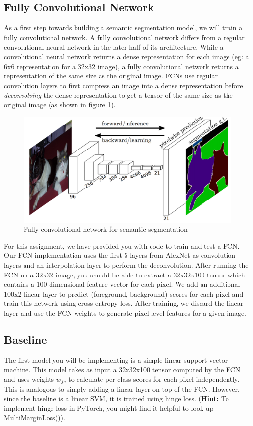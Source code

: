 \documentclass[11pt,addpoints,answers]{exam}
\numberwithin{equation}{section} %
\numberwithin{figure}{section} %
\numberwithin{table}{section} %
\begin{document}
\subsection{Fully Convolutional Network}
As a first step towards building a semantic segmentation model, we will train a fully convolutional network. A fully convolutional network differs from a regular convolutional neural network in the later half of its architecture. While a convolutional neural network returns a dense representation for each image (eg: a 6x6 representation for a 32x32 image), a fully convolutional network returns a representation of the same size as the original image. FCNs use regular convolution layers to first compress an image into a dense representation before \emph{deconvolving} the dense representation to get a tensor of the same size as the original image (as shown in figure \ref{fig:fcn}). 

\begin{figure}[h]
    \centering
    \includegraphics[scale=0.2]{figures/fcn_segmentation.png}
    \caption{Fully convolutional network for semantic segmentation}
    \label{fig:fcn}
\end{figure}

For this assignment, we have provided you with code to train and test a FCN. Our FCN implementation uses the first 5 layers from AlexNet as convolution layers and an interpolation layer to perform the deconvolution. After running the FCN on a 32x32 image, you should be able to extract a 32x32x100 tensor which contains a 100-dimensional feature vector for each pixel. We add an additional 100x2 linear layer to predict (foreground, background) scores for each pixel and train this network using cross-entropy loss. After training, we discard the linear layer and use the FCN weights to generate pixel-level features for a given image.

\subsection{Baseline}
The first model you will be implementing is a simple linear support vector machine. This model takes as input a 32x32x100 tensor computed by the FCN and uses weights $w_{fc}$ to calculate per-class scores for each pixel independently. This is analogous to simply adding a linear layer on top of the FCN. However, since the baseline is a linear SVM, it is trained using hinge loss. (\textbf{Hint:} To implement hinge loss in PyTorch, you might find it helpful to look up MultiMarginLoss()). 
\end{document}
